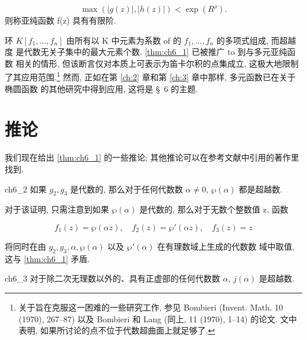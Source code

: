 \[\max(|g(z)|, |h(z)|) < \exp(R^{\rho}). \tag{1}\label{eq:ch6_1}\]
则称亚纯函数 f(z) 具有有限阶.

环 $K[f_1,\dots,f_n]$ 由所有以 K 中元素为系数 of 的 $f_1,\dots,f_n$ 的多项式组成, 而超越度 是代数无关子集中的最大元素个数. \autoref{thm:ch6_1} 已被推广 to 到与多元亚纯函数 相关的情形, 但该断言仅对本质上可表示为笛卡尔积的点集成立, 这极大地限制了其应用范围.\footnote{关于旨在克服这一困难的一些研究工作, 参见 Bombieri (Invent. Math. 10 (1970), 267--87) 以及 Bombieri 和 Lang (同上, 11 (1970), 1--14) 的论文. 文中表明, 如果所讨论的点不位于代数超曲面上就足够了.} 然而, 正如在第 \ref{ch:2} 章和第 \ref{ch:3} 章中那样, 多元函数已在关于椭圆函数 的其他研究中得到应用, 这将是 \S~6 的主题.

\section{推论}

我们现在给出 \autoref{thm:ch6_1} 的一些推论; 其他推论可以在参考文献中引用的著作里找到.

\begin{mythm}{}{ch6_2}
如果 $g_2, g_3$ 是代数的, 那么对于任何代数数 $\alpha \neq 0$, $\wp(\alpha)$ 都是超越数.
\end{mythm}

对于该证明, 只需注意到如果 $\wp(\alpha)$ 是代数的, 那么对于无数个整数值 z, 函数

\[f_1(z) = \wp(\alpha z), \quad f_2(z) = \wp'(\alpha z), \quad f_3(z) = z\]

将同时在由 $g_2, g_3, \alpha, \wp(\alpha)$ 以及 $\wp'(\alpha)$ 在有理数域上生成的代数数 域中取值, 这与 \autoref{thm:ch6_1} 矛盾.

\begin{mythm}{}{ch6_3}
对于除二次无理数以外的、具有正虚部的任何代数数 $\alpha$, $j(\alpha)$ 是超越数.
\end{mythm}

